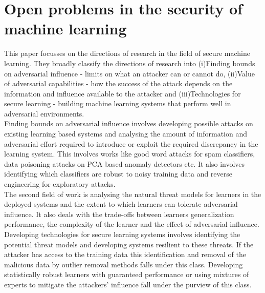 \documentclass[11pt]{article}
\begin{document}
\section{Open problems in the security of machine learning} This paper focusses on the directions of research in the field of secure machine learning. They broadly classify the directions of research into (i)Finding bounds on adversarial influence - limits on what an attacker can or cannot do, (ii)Value of adversarial capabilities - how the success of the attack depends on the information and influence available to the attacker and (iii)Technologies for secure learning - building machine learning systems that perform well in adversarial environments.\\ Finding bounds on adversarial influence involves developing possible attacks on existing learning based systems and analysing the amount of information and adversarial effort required to introduce or exploit the required discrepancy in the learning system. This involves works like good word attacks for spam classifiers, data poisoning attacks on PCA based anomaly detectors etc. It also involves identifying which classifiers are robust to noisy training data and reverse engineering for exploratory attacks. \\ The second field of work is analysing the natural threat models for learners in the deployed systems and the extent to which learners can tolerate adversarial influence. It also deals with the trade-offs between learners generalization performance, the complexity of the learner and the effect of adversarial influence. \\ Developing technologies for secure learning systems involves identifying the potential threat models and developing systems resilient to these threats. If the attacker has access to the training data this identification and removal of the malicious data by outlier removal methods falls under this class. Developing statistically robust learners with guaranteed performance or using mixtures of experts to mitigate the attackers' influence fall under the purview of this class. \\ \\
\end{document}
